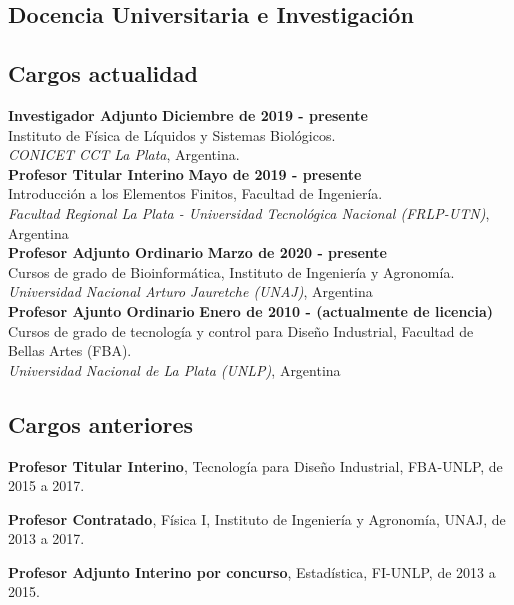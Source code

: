 \documentclass[margin,line]{res}
\begin{document}
\begin{resume}
\section{ Docencia Universitaria e Investigación}
\vspace*{-.2in}
\subsection{ Cargos actualidad}

{\bf Investigador Adjunto} \hfill {\bf Diciembre de 2019  - presente}\\
Instituto de Física de Líquidos y Sistemas Biológicos.\\
{\em CONICET CCT La Plata}, Argentina.\\

{\bf Profesor Titular Interino} \hfill {\bf Mayo de 2019  - presente}\\
Introducción a los Elementos Finitos, Facultad de Ingeniería.\\
{\em Facultad Regional La Plata - Universidad Tecnológica Nacional (FRLP-UTN)}, Argentina\\

{\bf Profesor Adjunto Ordinario} \hfill {\bf Marzo de 2020  - presente}\\
Cursos de grado de Bioinformática, Instituto de Ingeniería y Agronomía.\\
{\em Universidad Nacional Arturo Jauretche (UNAJ)}, Argentina\\

{\bf Profesor Ajunto Ordinario} \hfill {\bf Enero de 2010  - (actualmente de licencia)}\\
Cursos de grado de tecnología y control para Diseño Industrial, Facultad de Bellas Artes (FBA).\\
{\em Universidad Nacional de La Plata (UNLP)}, Argentina
\vspace*{-.1in}
\subsection{ Cargos anteriores}
\vspace*{-.1in}
{\bf Profesor Titular Interino}, Tecnología para Diseño Industrial, FBA-UNLP, de 2015 a 2017.

{\bf Profesor Contratado}, Física I, Instituto de Ingeniería y Agronomía, UNAJ, de 2013 a 2017.

{\bf Profesor Adjunto Interino por concurso}, Estadística, FI-UNLP, de 2013 a 2015.


\end{resume}
\end{document}
